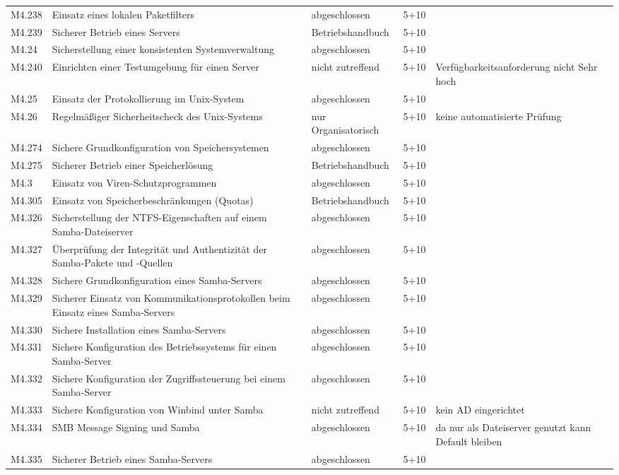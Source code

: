 \begin{longtable}{lp{3.7cm}p{3cm}lp{3.8cm}}
M4.238 & Einsatz eines lokalen Paketfilters & abgeschlossen & 5+10 &  \\
M4.239 & Sicherer Betrieb eines Servers & Betriebshandbuch & 5+10 &  \\
M4.24 & Sicherstellung einer konsistenten Systemverwaltung & abgeschlossen & 5+10 &  \\
M4.240 & Einrichten einer Testumgebung für einen Server & nicht zutreffend & 5+10 & Verfügbarkeitsanforderung nicht Sehr hoch \\
M4.25 & Einsatz der Protokollierung im Unix-System & abgeschlossen & 5+10 &  \\
M4.26 & Regelmäßiger Sicherheitscheck des Unix-Systems & nur Organisatorisch & 5+10 & keine automatisierte Prüfung \\
M4.274 & Sichere Grundkonfiguration von Speichersystemen & abgeschlossen & 5+10 &  \\
M4.275 & Sicherer Betrieb einer Speicherlösung & Betriebshandbuch & 5+10 &  \\
M4.3 & Einsatz von Viren-Schutzprogrammen & abgeschlossen & 5+10 &  \\
M4.305 & Einsatz von Speicherbeschränkungen (Quotas) & Betriebshandbuch & 5+10 &  \\
M4.326 & Sicherstellung der NTFS-Eigenschaften auf einem Samba-Dateiserver & abgeschlossen & 5+10 &  \\
M4.327 & Überprüfung der Integrität und Authentizität der Samba-Pakete und -Quellen & abgeschlossen & 5+10 &  \\
M4.328 & Sichere Grundkonfiguration eines Samba-Servers & abgeschlossen & 5+10 &  \\
M4.329 & Sicherer Einsatz von Kommunikationsprotokollen beim Einsatz eines Samba-Servers & abgeschlossen & 5+10 &  \\
M4.330 & Sichere Installation eines Samba-Servers & abgeschlossen & 5+10 &  \\
M4.331 & Sichere Konfiguration des Betriebssystems für einen Samba-Server & abgeschlossen & 5+10 &  \\
M4.332 & Sichere Konfiguration der Zugriffssteuerung bei einem Samba-Server & abgeschlossen & 5+10 &  \\
M4.333 & Sichere Konfiguration von Winbind unter Samba & nicht zutreffend & 5+10 & kein AD eingerichtet \\
M4.334 & SMB Message Signing und Samba & abgeschlossen & 5+10 & da nur als Dateiserver genutzt kann Default bleiben \\
M4.335 &  Sicherer Betrieb eines Samba-Servers & abgeschlossen & 5+10 &  \\

\end{longtable}
